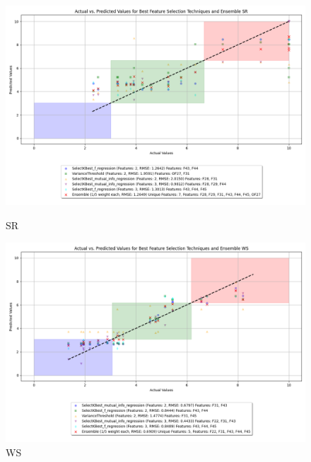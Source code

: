 \begin{figure}[H]
    \centering
    \begin{minipage}{0.45\textwidth}
        \centering
        \includegraphics[width=\linewidth]{reg_section_specific/images_reg_featred_ensemble/actual_vs_predicted_smallest_feature_selection_and_ensemble_SR.png}
        \caption{SR}
        \label{fig_reg_spec:sr_reg_featred_smallest_ensemble}
    \end{minipage}\hfill
    \begin{minipage}{0.45\textwidth}
        \centering
        \includegraphics[width=\linewidth]{reg_section_specific/images_reg_featred_ensemble/actual_vs_predicted_smallest_feature_selection_and_ensemble_WS.png}
        \caption{WS}
        \label{fig_reg_spec:ws_reg_featred_smallest_ensemble}
    \end{minipage}
\end{figure}

